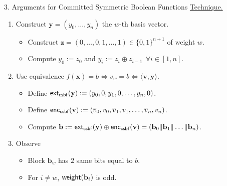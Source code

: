 \begin{frame}{3. Arguments for Committed Symmetric Boolean Functions}
	\underline{Technique.}\pause
	\begin{enumerate}
		\item Construct $\mathbf{y} = (y_0, \dots, y_n)$ the $w$-th basis vector.\pause
		\begin{itemize}
			\item Construct $\mathbf{z} = (0, \dots, 0, 1, \dots, 1) \in \{0,1\}^{n + 1}$ of weight $w$.\pause
			\item Compute $y_0 := z_0$ and $y_i := z_i \oplus z_{i - 1}~~ \forall i \in [1, n]$. \pause
		\end{itemize}
		\item Use equivalence $f(\mathbf{x}) = b \iff v_w = b \iff \langle\mathbf{v}, \mathbf{y}\rangle$.\pause
		\begin{itemize}
			\item Define $\mathsf{ext}_{\mathsf{csbf}}(\mathbf{y}) := (y_0, 0, y_1, 0, \dots, y_n, 0)$.\pause
			\item Define $\mathsf{enc}_{\mathsf{csbf}}(\mathbf{v}) := (\overline{v}_0, v_0, \overline{v}_1, v_1, \dots, \overline{v}_n, v_n)$.\pause
			\item Compute $\mathbf{b} := \mathsf{ext}_{\mathsf{csbf}}(\mathbf{y}) \oplus \mathsf{enc}_{\mathsf{csbf}}(\mathbf{v}) = (\mathbf{b}_0 \Vert \mathbf{b}_1\Vert \dots\Vert \mathbf{b}_n)$.\pause
		\end{itemize}
		\item Observe\pause
		\begin{itemize}
			\item Block $\mathbf{b}_w$ has $2$ same bits equal to $b$.\pause
			\item For $i \neq w$, $\mathsf{weight}(\mathbf{b}_i)$ is odd.
		\end{itemize}
	\end{enumerate}
\end{frame}